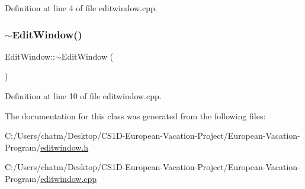Definition at line 4 of file editwindow.\+cpp.

\mbox{\label{class_edit_window_ad994e7010b7fe4e11ce488e9c3ea0c9a}} 
\subsubsection{\texorpdfstring{$\sim$EditWindow()}{~EditWindow()}}
{\footnotesize\ttfamily Edit\+Window\+::$\sim$\+Edit\+Window (\begin{DoxyParamCaption}{ }\end{DoxyParamCaption})}



Definition at line 10 of file editwindow.\+cpp.



The documentation for this class was generated from the following files\+:\begin{DoxyCompactItemize}
\item 
C\+:/\+Users/chatm/\+Desktop/\+C\+S1\+D-\/\+European-\/\+Vacation-\/\+Project/\+European-\/\+Vacation-\/\+Program/\mbox{\hyperlink{editwindow_8h}{editwindow.\+h}}\item 
C\+:/\+Users/chatm/\+Desktop/\+C\+S1\+D-\/\+European-\/\+Vacation-\/\+Project/\+European-\/\+Vacation-\/\+Program/\mbox{\hyperlink{editwindow_8cpp}{editwindow.\+cpp}}\end{DoxyCompactItemize}
